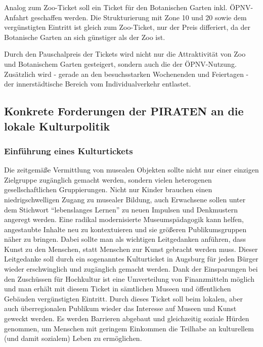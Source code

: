   Analog zum Zoo-Ticket soll ein Ticket für den Botanischen Garten inkl. 
  ÖPNV-Anfahrt geschaffen werden. Die Strukturierung mit Zone 10 und 20 sowie 
  dem vergünstigten Eintritt ist gleich zum Zoo-Ticket, nur der Preis 
  differiert, da der Botanische Garten an sich günstiger als der Zoo ist.
  
  Durch den Pauschalpreis der Tickets wird nicht nur die Attraktivität von Zoo 
  und Botanischem Garten gesteigert, sondern auch die der ÖPNV-Nutzung. 
  Zusätzlich wird - gerade an den besuchsstarken Wochenenden und Feiertagen - 
  der innerstädtische Bereich vom Individualverkehr entlastet.
  
  \subsection{Konkrete Forderungen der PIRATEN an die lokale Kulturpolitik}
  
  \subsubsection{Einführung eines Kulturtickets}
  
  Die zeitgemäße Vermittlung von musealen Objekten sollte nicht nur einer 
  einzigen Zielgruppe zugänglich gemacht werden, sondern vielen heterogenen 
  gesellschaftlichen Gruppierungen. Nicht nur Kinder brauchen einen 
  niedrigschwelligen Zugang zu musealer Bildung, auch Erwachsene sollen unter 
  dem Stichwort "`lebenslanges Lernen"' zu neuen Impulsen und Denkmustern 
  angeregt werden. Eine radikal modernisierte Museumspädagogik kann helfen, 
  angestaubte Inhalte neu zu kontextuieren und sie größeren Publikumsgruppen 
  näher zu bringen. Dabei sollte man als wichtigen Leitgedanken anführen, 
  dass Kunst zu den Menschen, statt Menschen zur Kunst gebracht werden muss. 
  Dieser Leitgedanke soll durch ein sogenanntes Kulturticket in Augsburg für 
  jeden Bürger wieder erschwinglich und zugänglich gemacht werden. Dank der 
  Einsparungen bei den Zuschüssen für Hochkultur ist eine Umverteilung von 
  Finanzmitteln möglich und man erhält mit diesem Ticket in sämtlichen Museen 
  und öffentlichen Gebäuden vergünstigten Eintritt. Durch dieses Ticket soll 
  beim lokalen, aber auch überregionalen Publikum wieder das Interesse auf 
  Museen und Kunst geweckt werden. Es werden Barrieren abgebaut und 
  gleichzeitig soziale Hürden genommen, um Menschen mit geringem Einkommen 
  die Teilhabe an kulturellem (und damit sozialem) Leben zu ermöglichen.
  
